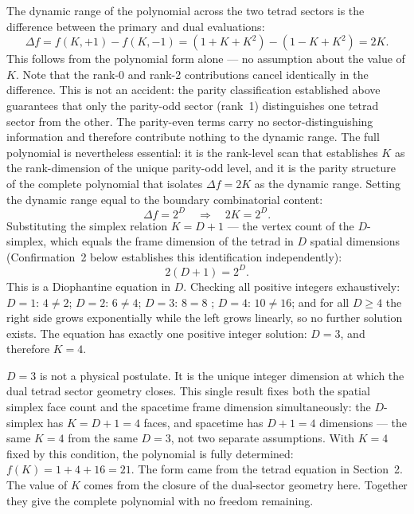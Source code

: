 \documentclass[a4paper,11pt]{article}
\begin{document}
The dynamic range of the polynomial across the two tetrad
sectors is the difference between the primary and dual
evaluations:
\begin{equation}
  \Delta f = f(K,+1) - f(K,-1) = (1 + K + K^2) - (1 - K + K^2) = 2K.
  \label{eq:range}
\end{equation}
This follows from the polynomial form alone --- no
assumption about the value of $K$. Note that the rank-0
and rank-2 contributions cancel identically in the
difference. This is not an accident: the parity
classification established above guarantees that only the
parity-odd sector (rank~1) distinguishes one tetrad
sector from the other. The parity-even terms carry no
sector-distinguishing information and therefore contribute
nothing to the dynamic range. The full polynomial is
nevertheless essential: it is the rank-level scan that
establishes $K$ as the rank-dimension of the unique
parity-odd level, and it is the parity structure of the
complete polynomial that isolates $\Delta f = 2K$ as the
dynamic range. Setting the dynamic
range equal to the boundary combinatorial content:
\begin{equation}
  \Delta f = 2^D
  \quad\Longrightarrow\quad
  2K = 2^D.
  \label{eq:closure}
\end{equation}
Substituting the simplex relation $K = D + 1$ ---
the vertex count of the $D$-simplex, which equals the
frame dimension of the tetrad in $D$ spatial dimensions
(Confirmation~2 below establishes this identification
independently):
\begin{equation}
  2(D + 1) = 2^D.
  \label{eq:diophantine}
\end{equation}
This is a Diophantine equation in $D$. Checking all
positive integers exhaustively:
$D = 1$: $4 \neq 2$;\quad
$D = 2$: $6 \neq 4$;\quad
$D = 3$: $8 = 8$ \checkmark;\quad
$D = 4$: $10 \neq 16$;\quad
and for all $D \geq 4$ the right side grows exponentially
while the left grows linearly, so no further solution
exists. The equation has exactly one positive integer
solution: $D = 3$, and therefore $K = 4$.

$D = 3$ is not a physical postulate. It is the unique
integer dimension at which the dual tetrad sector geometry
closes. This single result fixes both the spatial simplex
face count and the spacetime frame dimension simultaneously:
the $D$-simplex has $K = D+1 = 4$ faces, and spacetime has
$D+1 = 4$ dimensions --- the same $K = 4$ from the same
$D = 3$, not two separate assumptions. With $K = 4$ fixed
by this condition, the polynomial is fully determined:
$f(K) = 1 + 4 + 16 = 21$. The form came from the tetrad
equation in Section~2. The value of $K$ comes from the
closure of the dual-sector geometry here. Together they
give the complete polynomial with no freedom remaining.
\end{document}
